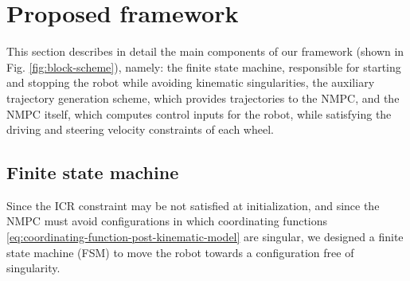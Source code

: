 \section{Proposed framework}
\label{sec:proposed-framework}
This section describes in detail the main components of our framework
(shown in Fig. \ref{fig:block-scheme}), namely: the finite state machine,
responsible for starting and stopping the robot while avoiding kinematic
singularities, the auxiliary trajectory generation scheme, which provides
trajectories to the NMPC, and the NMPC itself, which computes control inputs
for the robot, while satisfying the driving and steering velocity constraints
of each wheel.

\subsection{Finite state machine}
\label{sec:finite-state-machine}
Since the ICR constraint may be not satisfied at initialization, and since the
NMPC must avoid configurations in which coordinating functions
\eqref{eq:coordinating-function-post-kinematic-model} are singular, we
designed a finite state machine (FSM) to move the robot towards a configuration
free of singularity.

